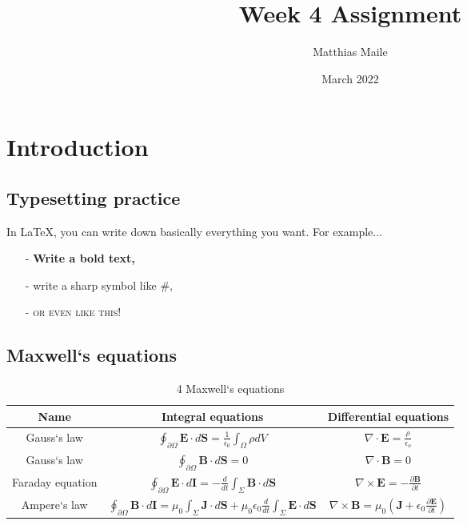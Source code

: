\documentclass{article}
\author{Matthias Maile}
\date{March 2022}
\title{Week 4 Assignment}
\begin{document}
\maketitle
\tableofcontents

\section{Introduction}
\subsection{Typesetting practice}
In \LaTeX, you can write down basically everything you want. For example...
\begin{itemize}
	\item[-] \textbf{Write a bold text,}
	\item[-] write a sharp symbol like \#,
	\item[-] \textsc{or even like this!}
\end{itemize}

\newpage
\subsection{Maxwell`s equations}
\begin{table}[H]
	\begin{tabular}{|c || c | c|}
		\hline
		Name & Integral equations & Differential equations \\
		\hline
		Gauss`s law &
		$\displaystyle \oint_{\partial \Omega} \textbf{E} \cdot d\textbf{S} = \frac{1}{\epsilon_0} \int_\Omega \rho dV$ &
		$\displaystyle \nabla \cdot \textbf{E} = \frac{\rho}{\epsilon_o}$ \\
		\hline
		Gauss`s law &
		$\displaystyle \oint_{\partial \Omega} \textbf{B} \cdot d\textbf{S} = 0$ &
		$\displaystyle \nabla \cdot \textbf{B} = 0$ \\
		\hline
		Faraday equation &
		$\displaystyle \oint_{\partial \Omega} \textbf{E} \cdot d\textbf{I} = 
		-\frac{d}{dt} \int_{\Sigma} \textbf{B} \cdot d\textbf{S}$ &
		$\displaystyle \nabla \times \textbf{E} = -\frac{\partial\textbf{B}}{\partial t}$ \\
		\hline
		Ampere`s law &
		$\displaystyle \oint_{\partial \Omega} \textbf{B} \cdot d\textbf{I} = 
		\mu_0 \int_{\Sigma} \textbf{J} \cdot d\textbf{S} +
		\mu_0\epsilon_0 \frac{d}{dt} \int_{\Sigma} \textbf{E} \cdot d\textbf{S}$ &
		$\displaystyle \nabla \times \textbf{B} = \mu_0 \left(\textbf{J} + \epsilon_0 \frac{\partial\textbf{E}}{\partial t} \right)$ \\
		\hline
	\end{tabular}
	\caption{4 Maxwell`s equations}
	\label{tab:equations}
\end{table}
\end{document}

